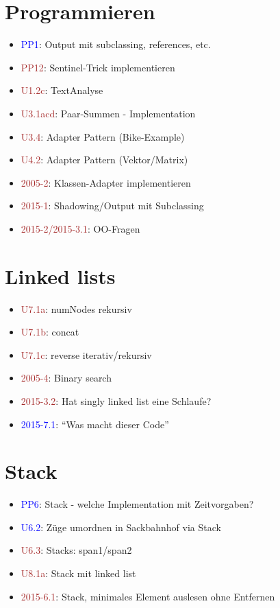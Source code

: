 \documentclass[a4paper]{article}
\newcommand{\ub}[1]{\textcolor{blue}{#1}}
\newcommand{\ubc}[1]{\textcolor{brown}{#1}}
\begin{document}
\section{Programmieren}
\begin{itemize}
  \item \ub{PP1}: Output mit subclassing, references, etc.
  \item \ubc{PP12}: Sentinel-Trick implementieren
  \item \ubc{U1.2c}: TextAnalyse
  \item \ubc{U3.1acd}: Paar-Summen - Implementation
  \item \ubc{U3.4}: Adapter Pattern (Bike-Example)
  \item \ubc{U4.2}: Adapter Pattern (Vektor/Matrix)
  \item \ubc{2005-2}: Klassen-Adapter implementieren
  \item \ubc{2015-1}: Shadowing/Output mit Subclassing
  \item \ubc{2015-2/2015-3.1}: OO-Fragen
\end{itemize}

\section{Linked lists}
\begin{itemize}
  \item \ubc{U7.1a}: numNodes rekursiv
  \item \ubc{U7.1b}: concat
  \item \ubc{U7.1c}: reverse iterativ/rekursiv
  \item \ubc{2005-4}: Binary search
  \item \ubc{2015-3.2}: Hat singly linked list eine Schlaufe?
  \item \ub{2015-7.1}: ``Was macht dieser Code''
\end{itemize}

\section{Stack}
\begin{itemize}
  \item \ub{PP6}: Stack - welche Implementation mit Zeitvorgaben?
  \item \ub{U6.2}: Züge umordnen in Sackbahnhof via Stack
  \item \ubc{U6.3}: Stacks: span1/span2
  \item \ubc{U8.1a}: Stack mit linked list
  \item \ubc{2015-6.1}: Stack, minimales Element auslesen ohne Entfernen
\end{itemize}
\end{document}
